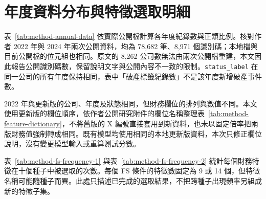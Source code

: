 \clearpage
\section{年度資料分布與特徵選取明細}\label{sec:appendix-data-fs}

表~\ref{tab:method-annual-data} 依實際公開檔計算各年度紀錄數與正類比例。核對作者 2022 年與 2024 年兩次公開資料，均為 78,682 筆、8,971 個識別碼；本地檔與目前公開檔的位元組也相同。原文的 8,262 公司數無法由兩次公開檔重建，本文因此報告公開識別碼數，保留說明文字與公開內容不一致的限制。\nolinkurl{status_label} 在同一公司的所有年度保持相同，表中「破產標籤紀錄數」不是該年度新增破產事件數。

2022 年與更新版的公司、年度及狀態相同，但財務欄位的排列與數值不同。本文使用更新版的欄位順序，依作者公開研究附件的欄位名稱整理表~\ref{tab:method-feature-dictionary}，不將舊版的 X 編號直接套用到新資料，也未以固定倍率把兩版財務值強制轉成相同。既有模型均使用相同的本地更新版資料，本次只修正欄位說明，沒有變更模型輸入或重算測試分數。



表~\ref{tab:method-fs-frequency-1} 與表~\ref{tab:method-fs-frequency-2} 統計每個財務特徵在十個種子中被選取的次數。每個 FS 條件的特徵數固定為 9 或 14 個，但特徵名稱可能隨種子而異。此處只描述已完成的選取結果，不把跨種子出現頻率另組成新的特徵子集。



\endgroup
